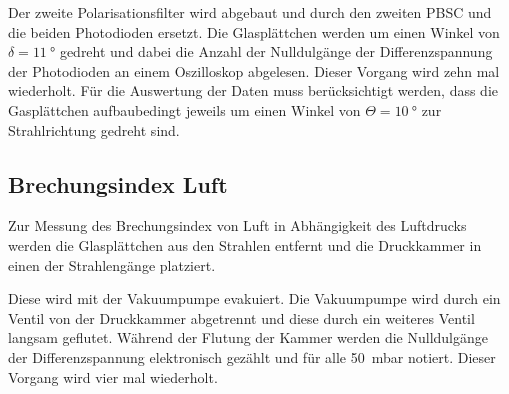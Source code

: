 Der zweite Polarisationsfilter wird abgebaut und durch den zweiten PBSC und die beiden Photodioden ersetzt.
Die Glasplättchen werden um einen Winkel von $\delta = \SI{11}{\degree}$ gedreht und dabei die Anzahl der Nulldulgänge der Differenzspannung der Photodioden an einem Oszilloskop abgelesen.
Dieser Vorgang wird zehn mal wiederholt.
Für die Auswertung der Daten muss berücksichtigt werden, dass die Gasplättchen aufbaubedingt jeweils um einen Winkel von $\Theta = \SI{10}{\degree}$ zur Strahlrichtung gedreht sind.

\subsection{Brechungsindex Luft}

Zur Messung des Brechungsindex von Luft in Abhängigkeit des Luftdrucks werden die Glasplättchen aus den Strahlen entfernt und die Druckkammer in einen der Strahlengänge platziert.\par
Diese wird mit der Vakuumpumpe evakuiert.
Die Vakuumpumpe wird durch ein Ventil von der Druckkammer abgetrennt und diese durch ein weiteres Ventil langsam geflutet.
Während der Flutung der Kammer werden die Nulldulgänge der Differenzspannung elektronisch gezählt und für alle \SI{50}{\milli\bar} notiert.
Dieser Vorgang wird vier mal wiederholt.

